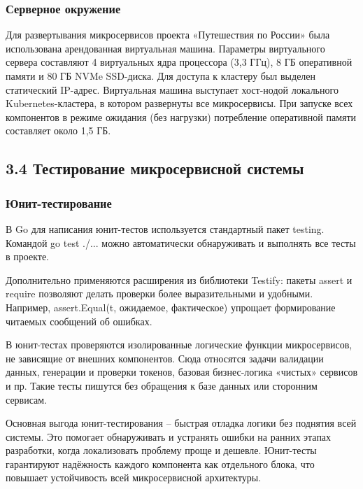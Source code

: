 \subsubsection*{Серверное окружение}
Для развертывания микросервисов проекта «Путешествия по России» была использована арендованная виртуальная машина. Параметры виртуального сервера составляют 4 виртуальных ядра процессора (3,3 ГГц), 8 ГБ оперативной памяти и 80 ГБ NVMe SSD-диска. Для доступа к кластеру был выделен статический IP-адрес. Виртуальная машина выступает хост-нодой локального Kubernetes-кластера, в котором развернуты все микросервисы. При запуске всех компонентов в режиме ожидания (без нагрузки) потребление оперативной памяти составляет около 1,5 ГБ.

\subsection*{3.4 Тестирование микросервисной системы}

\subsubsection*{Юнит-тестирование}
В Go для написания юнит-тестов используется стандартный пакет testing. Командой go test ./... можно автоматически обнаруживать и выполнять все тесты в проекте.

Дополнительно применяются расширения из библиотеки Testify: пакеты assert и require позволяют делать проверки более выразительными и удобными. Например, assert.Equal(t, ожидаемое, фактическое) упрощает формирование читаемых сообщений об ошибках.

В юнит-тестах проверяются изолированные логические функции микросервисов, не зависящие от внешних компонентов. Сюда относятся задачи валидации данных, генерации и проверки токенов, базовая бизнес-логика «чистых» сервисов и пр. Такие тесты пишутся без обращения к базе данных или сторонним сервисам.

Основная выгода юнит-тестирования – быстрая отладка логики без поднятия всей системы. Это помогает обнаруживать и устранять ошибки на ранних этапах разработки, когда локализовать проблему проще и дешевле. Юнит-тесты гарантируют надёжность каждого компонента как отдельного блока, что повышает устойчивость всей микросервисной архитектуры.

